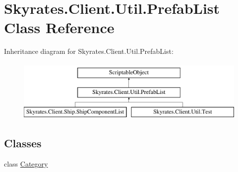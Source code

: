 \hypertarget{class_skyrates_1_1_client_1_1_util_1_1_prefab_list}{\section{Skyrates.\-Client.\-Util.\-Prefab\-List Class Reference}
\label{class_skyrates_1_1_client_1_1_util_1_1_prefab_list}
}


 


Inheritance diagram for Skyrates.\-Client.\-Util.\-Prefab\-List\-:\begin{figure}[H]
\begin{center}
\leavevmode
\includegraphics[height=3.000000cm]{class_skyrates_1_1_client_1_1_util_1_1_prefab_list}
\end{center}
\end{figure}
\subsection*{Classes}
\begin{DoxyCompactItemize}
\item 
class \hyperlink{class_skyrates_1_1_client_1_1_util_1_1_prefab_list_1_1_category}{Category}
\end{DoxyCompactItemize}
